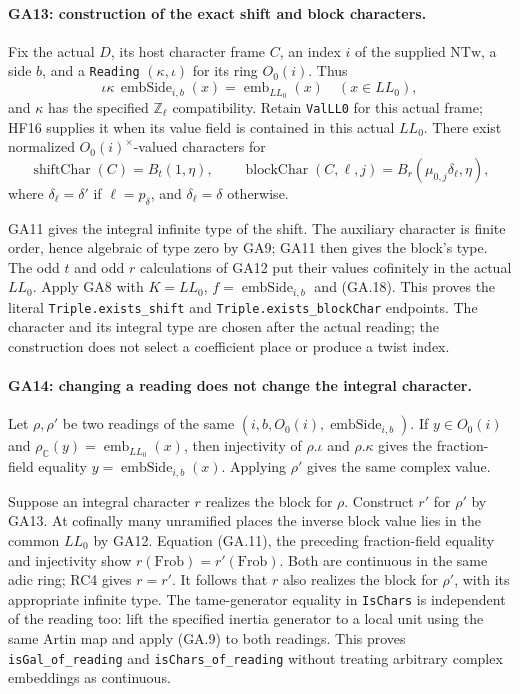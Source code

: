 \paragraph{GA13: construction of the exact shift and block characters.}
Fix the actual $D$, its host character frame $C$, an index
$i$ of the supplied $\mathrm{NTw}$, a side $b$, and a
\texttt{Reading} $(\kappa,\iota)$ for its ring $O_0(i)$.
Thus
\[
 \iota\kappa\,\operatorname{embSide}_{i,b}(x)
       =\operatorname{emb}_{LL_0}(x)
 \quad(x\in LL_0),                                     \tag{GA.18}
\]
and $\kappa$ has the specified $\mathbb Z_\ell$ compatibility.
Retain \texttt{ValLL0} for this actual frame; HF16 supplies
it when its value field is contained in this actual $LL_0$.
There exist normalized $O_0(i)^\times$-valued characters
for
\[
 \operatorname{shiftChar}(C)=B_t(1,\eta),\qquad
 \operatorname{blockChar}(C,\ell,j)
        =B_r(\mu_{0,j}\delta_\ell,\eta),                 \tag{GA.19}
\]
where $\delta_\ell=\delta'$ if $\ell=p_\delta$, and
$\delta_\ell=\delta$ otherwise.

GA11 gives the integral infinite type of the shift.
The auxiliary character is finite order, hence algebraic
of type zero by GA9; GA11 then gives the block's type.
The odd $t$ and odd $r$ calculations of GA12 put their
values cofinitely in the actual $LL_0$.
Apply GA8 with $K=LL_0$, $f=\operatorname{embSide}_{i,b}$
and (GA.18). This proves the literal
\texttt{Triple.exists\_shift} and
\texttt{Triple.exists\_blockChar} endpoints. The character
and its integral type are chosen after the actual reading;
the construction does not select a coefficient place or
produce a twist index.

\paragraph{GA14: changing a reading does not change the integral character.}
Let $\rho,\rho'$ be two readings of the same
$(i,b,O_0(i),\operatorname{embSide}_{i,b})$. If
$y\in O_0(i)$ and
$\rho_{\mathbb C}(y)=\operatorname{emb}_{LL_0}(x)$, then
injectivity of $\rho.\iota$ and $\rho.\kappa$ gives the
fraction-field equality
$y=\operatorname{embSide}_{i,b}(x)$.
Applying $\rho'$ gives the same complex value.

Suppose an integral character $r$ realizes the block for
$\rho$. Construct $r'$ for $\rho'$ by GA13. At cofinally
many unramified places the inverse block value lies in
the common $LL_0$ by GA12. Equation (GA.11), the preceding
fraction-field equality and injectivity show
$r(\mathrm{Frob})=r'(\mathrm{Frob})$.
Both are continuous in the same adic ring; RC4 gives
$r=r'$. It follows that $r$ also realizes the block for
$\rho'$, with its appropriate infinite type.
The tame-generator equality in \texttt{IsChars} is
independent of the reading too: lift the specified
inertia generator to a local unit using the same Artin
map and apply (GA.9) to both readings. This proves
\texttt{isGal\_of\_reading} and \texttt{isChars\_of\_reading}
without treating arbitrary complex embeddings as continuous.

